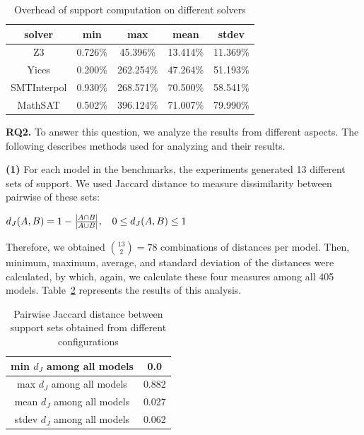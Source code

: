\begin{table}
  \centering
  \begin{tabular}{ |c||c|c|c|c| }
    \hline
     solver & min & max & mean & stdev \\[0.5ex]
    \hline
    Z3   & 0.726\% & 45.396\% & 13.414\% & 11.369\% \\[0.5ex]
    Yices &   0.200\%  & 262.254\%   & 47.264\% & 51.193\% \\[0.5ex]
    SMTInterpol& 0.930\% & 268.571\% &  70.500\% & 58.541\%\\[0.5ex]
    MathSAT & 0.502\% & 396.124\% &  71.007\% & 79.990\%\\[0.5ex]
    \hline
  \end{tabular}
  \caption{\small{Overhead of support computation on different solvers}}
  \label{tab:overhead}
\end{table}

\noindent{}
 \vspace{9pt}

\textbf{RQ2.} To answer this question, we analyze the results from different aspects. The following describes methods used for analyzing and their results.

\textbf{(1)} For each model in the benchmarks, the experiments generated 13 different sets of support. We used Jaccard distance to measure dissimilarity between pairwise of these sets:

\begin{center}
$d_J(\small{A}, \small{B}) = 1 - \frac{|A \cap B|}{|A \cup B|} ,\hspace{9pt} 0 \leq d_J(\small{A}, \small{B}) \leq 1$
\end{center}
\vspace{6pt} 

Therefore, we obtained $\binom{13}{2} = 78$ combinations of distances per model. Then, minimum, maximum, average, and standard deviation of the distances were calculated, by which, again, we calculate these four measures among all 405 models. Table~\ref{tab:pairwise-jd} represents the results of this analysis.

\begin{table}
  \centering
  \begin{tabular}{ |c|c|}
    \hline
     min $d_J$ among all models& 0.0 \\[0.5ex]
     \hline
     max $d_J$ among all models& 0.882\\[0.5ex]
     \hline
     mean $d_J$ among all models& 0.027\\[0.5ex]
     \hline
     stdev $d_J$ among all models& 0.062\\[0.5ex]
    \hline
  \end{tabular}
  \caption{\small{Pairwise Jaccard distance between support sets obtained from different configurations}}
  \label{tab:pairwise-jd}
\end{table}


